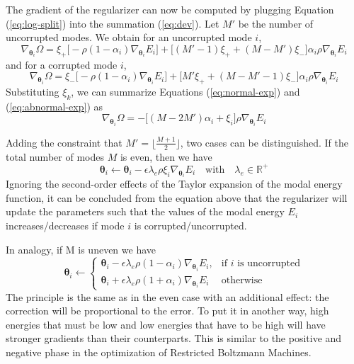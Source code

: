 The gradient of the regularizer can now be computed by plugging Equation (\ref{eq:log-split}) into the summation (\ref{eq:dev}). Let $M'$ be the number of uncorrupted modes. We obtain for an uncorrupted mode $i$,
\begin{equation}
\nabla_{\bm{\theta}_i}\Omega = \xi_+\big[ -\rho(1-\alpha_i)\nabla_{\bm{\theta}_i}E_i \big] + \big[(M'-1)\xi_+ + (M-M')\xi_-\big]\alpha_i\rho\nabla_{\bm{\theta}_i}E_i
\label{eq:normal-exp}
\end{equation}
and for a corrupted mode $i$,
\begin{equation}
\nabla_{\bm{\theta}_i}\Omega =\xi_-\big[ -\rho(1-\alpha_i)\nabla_{\bm{\theta}_i}E_i \big] + \big[M'\xi_+ + (M-M'-1)\xi_-\big]\alpha_i\rho\nabla_{\bm{\theta}_i}E_i
\label{eq:abnormal-exp}
\end{equation}
Substituting $\xi_k$, we can summarize Equations (\ref{eq:normal-exp}) and (\ref{eq:abnormal-exp}) as
\begin{equation}
\boxed{\nabla_{\bm{\theta}_i}\Omega = -\big[(M-2M')\alpha_i + \xi_i\big]\rho\nabla_{\bm{\theta}_i}E_i}
\end{equation}


Adding the constraint that $M' = \lfloor \frac{M+1}{2} \rfloor$, two cases can be distinguished. If the total number of modes $M$ is even, then we have
\begin{equation}
\bm{\theta}_i \leftarrow \bm{\theta}_i - \epsilon\lambda_e\rho\xi_i\nabla_{\bm{\theta}_i}E_i \quad \text{with} \quad \lambda_e \in \mathbb{R}^+
\end{equation}
Ignoring the second-order effects of the Taylor expansion of the modal energy function, it can be concluded from the equation above that the regularizer will update the parameters such that the values of the modal energy $E_i$ increases/decreases if mode $i$ is corrupted/uncorrupted.

In analogy, if M is uneven we have
\begin{equation}
\bm{\theta}_i \leftarrow \begin{cases}
       \bm{\theta}_i - \epsilon\lambda_e\rho(1-\alpha_i)\nabla_{\bm{\theta}_i}E_i, & \text{if $i$ is uncorrupted} \\
       \bm{\theta}_i + \epsilon\lambda_e\rho(1+\alpha_i)\nabla_{\bm{\theta}_i}E_i & \text{otherwise}
    \end{cases}
\end{equation}
The principle is the same as in the even case with an additional effect: the correction will be proportional to the error. To put it in another way, high energies that must be low and low energies that have to be high will have stronger gradients than their counterparts. This is similar to the positive and negative phase in the optimization of Restricted Boltzmann Machines.

